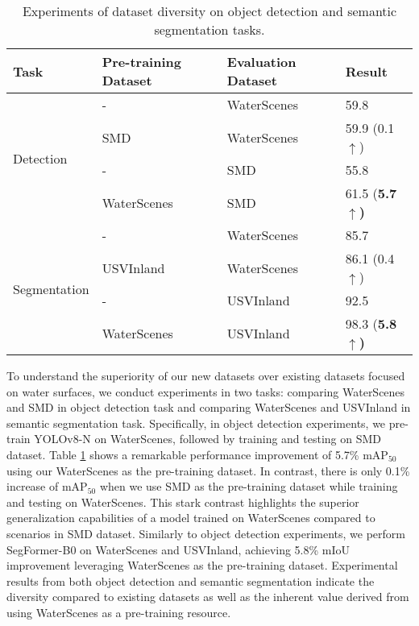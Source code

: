 \documentclass[lettersize,journal]{IEEEtran}
\begin{document}
\begin{table}[htbp]
\caption{Experiments of dataset diversity on object detection and semantic segmentation tasks.}
\center
\footnotesize
\begin{tabular*}{1\linewidth}{
p{1.4cm}<{}
p{2.4cm}<{\centering}
p{2.2cm}<{\centering}
p{1.3cm}<{\centering}
}
\toprule
\bf{Task} & \bf{Pre-training Dataset} & \bf{Evaluation Dataset} & \bf{Result} \\\midrule
\multirow{4}{*}{Detection} 
& - & WaterScenes & 59.8 \\
& SMD & WaterScenes & 59.9 (0.1$\uparrow$) \\ \cmidrule(lr){2-4}
& - & SMD & 55.8 \\
& WaterScenes & SMD & 61.5 (\bf{5.7}$\uparrow$) \\ \midrule

\multirow{4}{*}{Segmentation} 
& - & WaterScenes & 85.7 \\
& USVInland & WaterScenes & 86.1 (0.4$\uparrow$) \\ \cmidrule(lr){2-4}
& - & USVInland & 92.5 \\
& WaterScenes & USVInland & 98.3 (\bf{5.8}$\uparrow$) \\
\bottomrule
\end{tabular*}
\vspace{1mm}
\label{tab:domain-gap-1}
\end{table}

To understand the superiority of our new datasets over existing datasets focused on water surfaces, we conduct experiments in two tasks: comparing WaterScenes and SMD \cite{moosbauer2019benchmark} in object detection task and comparing WaterScenes and USVInland \cite{cheng2021we} in semantic segmentation task. 
Specifically, in object detection experiments, we pre-train YOLOv8-N \cite{yolov8} on WaterScenes, followed by training and testing on SMD dataset.
Table \ref{tab:domain-gap-1} shows a remarkable performance improvement of 5.7\% mAP$_{50}$ using our WaterScenes as the pre-training dataset. 
In contrast, there is only 0.1\% increase of mAP$_{50}$ when we use SMD as the pre-training dataset while training and testing on WaterScenes. 
This stark contrast highlights the superior generalization capabilities of a model trained on WaterScenes compared to scenarios in SMD dataset.
Similarly to object detection experiments, we perform SegFormer-B0 \cite{xie2021segformer} on WaterScenes and USVInland, achieving 5.8\% mIoU improvement leveraging WaterScenes as the pre-training dataset.
Experimental results from both object detection and semantic segmentation indicate the diversity compared to existing datasets as well as the inherent value derived from using WaterScenes as a pre-training resource. 
\end{document}
